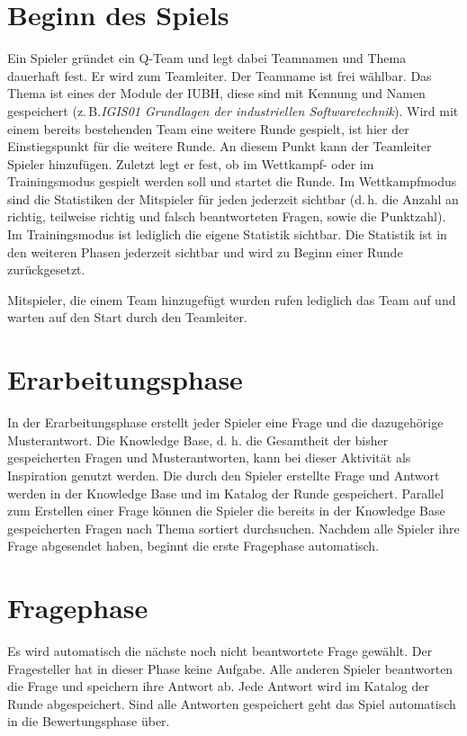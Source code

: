 \documentclass[a4paper,11pt,listof=numbered,glossary=totoc,parskip=half,toc=bib]{scrreprt}
\newcommand{\zB}{\mbox{z.\,B.}\xspace}
\newcommand{\dash}{\mbox{d.\,h.}\xspace}
\begin{document}
	\section{Beginn des Spiels}
	Ein Spieler gründet ein Q-Team und legt dabei Teamnamen und Thema dauerhaft fest. Er wird zum Teamleiter. Der Teamname ist frei wählbar. Das Thema ist eines der Module der IUBH, diese sind mit Kennung und Namen gespeichert (\zB \textit{IGIS01 Grundlagen der industriellen Softwaretechnik}). 
	Wird mit einem bereits bestehenden Team eine weitere Runde gespielt, ist hier der Einstiegspunkt für die weitere Runde.
	An diesem Punkt kann der Teamleiter Spieler hinzufügen.
	Zuletzt legt er fest, ob im Wettkampf- oder im Trainingsmodus gespielt werden soll und startet die Runde.
	Im Wettkampfmodus sind die Statistiken der Mitspieler für jeden jederzeit sichtbar (\dash die Anzahl an richtig, teilweise richtig und falsch beantworteten Fragen, sowie die Punktzahl). Im Trainingsmodus ist lediglich die eigene Statistik sichtbar. Die Statistik ist in den weiteren Phasen jederzeit sichtbar und wird zu Beginn einer Runde zurückgesetzt.
	
	Mitspieler, die einem Team hinzugefügt wurden rufen lediglich das Team auf und warten auf den Start durch den Teamleiter.
	
	\section{Erarbeitungsphase}
	In der Erarbeitungsphase erstellt jeder Spieler eine Frage und die dazugehörige Musterantwort. Die
Knowledge Base, d. h. die Gesamtheit der bisher gespeicherten Fragen und Musterantworten, kann
bei dieser Aktivität als Inspiration genutzt werden. Die durch den Spieler erstellte Frage und Antwort
werden in der Knowledge Base und im Katalog der Runde gespeichert. 
Parallel zum Erstellen einer Frage können die Spieler die bereits in der Knowledge Base gespeicherten Fragen nach Thema sortiert durchsuchen.
Nachdem alle Spieler ihre Frage abgesendet haben, beginnt die erste Fragephase automatisch.

	\section{Fragephase}
	Es wird automatisch die nächste noch nicht beantwortete Frage gewählt. Der Fragesteller hat in dieser Phase keine Aufgabe. Alle anderen Spieler beantworten die Frage und speichern ihre Antwort ab. Jede Antwort wird im Katalog der Runde abgespeichert. Sind alle Antworten gespeichert geht das Spiel automatisch in die Bewertungsphase über.
	
\end{document}
